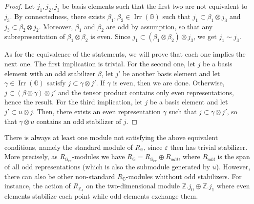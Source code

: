 \documentclass[a4paper, 11pt]{amsart}
\theoremstyle{plain}
\theoremstyle{definition}
\theoremstyle{remark}
\DeclareMathOperator{\Irr}{Irr}
\newcommand{\G}{\mathbb{G}}
\newcommand{\Z}{\mathbb{Z}}
\begin{document}
\begin{proof}
Let $j_{1}, j_{2}, j_{3}$ be basis elements such that the first two are not equivalent to $j_{3}$. By connectedness, there exists $\beta_{1}, \beta_{2}\in \Irr(\G)$ such that $j_{1}\subset \beta_{1}\otimes j_{3}$ and $j_{3}\subset\beta_{2}\otimes j_{2}$. Moreover, $\beta_{1}$ and $\beta_{2}$ are odd by assumption, so that any subrepresentation of $\beta_{1}\otimes\beta_{2}$ is even. Since $j_{1}\subset (\beta_{1}\otimes \beta_{2})\otimes j_{3}$, we get $j_{1}\sim j_{3}$.

As for the equivalence of the statements, we will prove that each one implies the next one. The first implication is trivial. For the second one, let $j$ be a basis element with an odd stabilizer $\beta$, let $j'$ be another basis element and let $\gamma\in \Irr(\G)$ satisfy $j\subset\gamma\otimes j'$. If $\gamma$ is even, then we are done. Otherwise, $j\subset (\beta\otimes \gamma)\otimes j'$ and the tensor product contains only even representations, hence the result. For the third implication, let $j$ be a basis element and let $j'\subset u\otimes j$. Then, there exists an even representation $\gamma$ such that $j\subset \gamma\otimes j'$, so that $\gamma\otimes u$ contains an odd stabilizer of $j$.
\end{proof}

There is always at least one module not satisfying the above equivalent conditions, namely the standard module of $R_{\G}$, since $\varepsilon$ then has trivial stabilizer. More precisely, as $R_{\G_{ev}}$-modules we have $R_{\G} = R_{\G_{ev}}\oplus R_{odd}$, where $R_{odd}$ is the span of all odd representations (which is also the submodule generated by $u$). However, there can also be other non-standard $R_{\G}$-modules whithout odd stabilizers. For instance, the action of $R_{\Z_{4}}$ on the two-dimensional module $\Z.j_{0}\oplus\Z.j_{1}$ where even elements stabilize each point while odd elements exchange them.
\end{document}

